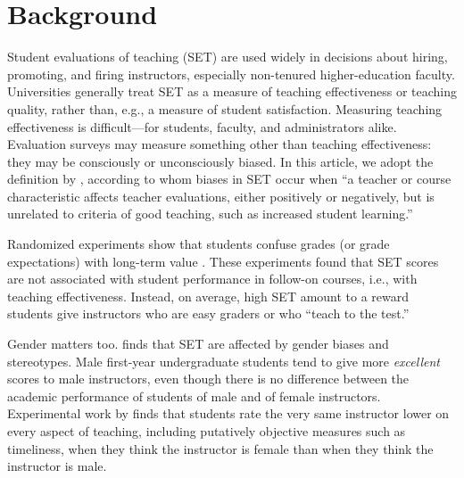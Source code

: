 \documentclass[12pt]{article}
\begin{document}
\begin{quotation}
\begin{abstract}
%

\end{abstract}

\newpage

\end{quotation}

\section{Background}
Student evaluations of teaching (SET) are used widely 
in decisions about hiring, promoting, and firing instructors, especially non-tenured 
higher-education faculty. 
Universities generally treat SET as a measure of teaching effectiveness or teaching quality, 
rather than, e.g., a measure of student satisfaction.
Measuring teaching effectiveness is difficult---for students,
faculty, and administrators alike.
Evaluation surveys may measure something other than teaching effectiveness:
they may be consciously or unconsciously biased. 
In this article, we adopt the definition by \citet[p.17]{Centra2000}, according to whom 
biases in SET occur when ``a teacher
or course characteristic affects teacher evaluations, either positively or
negatively, but is unrelated to criteria of good teaching, such as increased student learning.'' 

Randomized experiments show that students confuse grades 
(or grade expectations) with long-term value \citep{Carrell2010a,Braga2014}. 
These experiments found that SET scores are not associated with 
student performance in follow-on courses, i.e., with teaching effectiveness. 
Instead, on average, high SET amount to a reward students give 
instructors who are easy graders or who ``teach to the test.''  

Gender matters too.
\citet{Boring2015} finds that SET are affected by gender biases and stereotypes. 
Male first-year undergraduate students tend to give more \textit{excellent} scores to male instructors,
even though there is no difference between
the academic performance of students of male and of female instructors.
Experimental work by \citet{MacNell2014} finds that
students rate the very same instructor lower on every aspect of teaching,
including putatively objective measures such as timeliness, when they think the instructor is 
female than when they think the instructor is male. 
\end{document}
